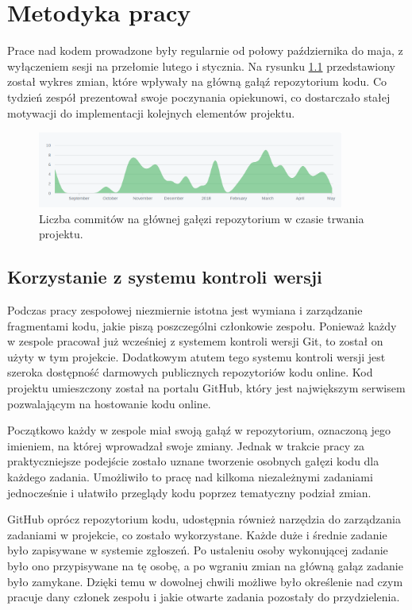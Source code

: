 \documentclass[licencjacka]{pracamgr}
\begin{document}
\chapter{Metodyka pracy}
Prace nad kodem prowadzone były regularnie od połowy października do maja,
z wyłączeniem sesji na przełomie lutego i stycznia. Na rysunku \ref{img:commits_over_time}
przedstawiony został wykres zmian, które wpływały na główną gałąź repozytorium kodu.
Co tydzień zespół prezentował swoje poczynania opiekunowi, co dostarczało stałej motywacji
do implementacji kolejnych elementów projektu.

\begin{figure}[h]
  \centering
  \includegraphics[width=0.9\textwidth]{commits_over_time}
  \caption{Liczba commitów na głównej gałęzi repozytorium w czasie trwania projektu.}
  \label{img:commits_over_time}
\end{figure}

\section{Korzystanie z systemu kontroli wersji}
Podczas pracy zespołowej niezmiernie istotna jest wymiana i zarządzanie fragmentami kodu,
jakie piszą poszczególni członkowie zespołu. Ponieważ każdy w zespole pracował już
wcześniej z systemem kontroli wersji Git, to został on użyty w tym projekcie.
Dodatkowym atutem tego systemu kontroli wersji jest szeroka dostępność darmowych
publicznych repozytoriów kodu online. Kod projektu umieszczony został na portalu
GitHub, który jest największym serwisem pozwalającym na hostowanie kodu online.

Początkowo każdy w zespole miał swoją gałąź w repozytorium, oznaczoną jego imieniem,
na której wprowadzał swoje zmiany. Jednak w trakcie pracy za praktyczniejsze podejście
zostało uznane tworzenie osobnych gałęzi kodu dla każdego zadania.
Umożliwiło to pracę nad kilkoma niezależnymi zadaniami jednocześnie i ułatwiło
przeglądy kodu poprzez tematyczny podział zmian.

GitHub oprócz repozytorium kodu, udostępnia również narzędzia do zarządzania zadaniami
w projekcie, co zostało wykorzystane. Każde duże i średnie zadanie było zapisywane
w systemie zgłoszeń. Po ustaleniu osoby wykonującej zadanie było ono przypisywane
na tę osobę, a po wgraniu zmian na główną gałąz zadanie było zamykane.
Dzięki temu w dowolnej chwili możliwe było określenie nad czym pracuje dany członek
zespołu i jakie otwarte zadania pozostały do przydzielenia.
\end{document}
